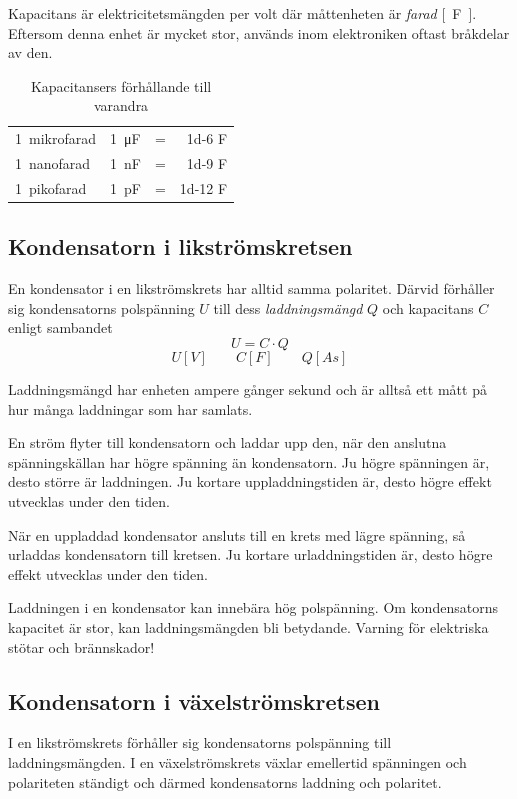 Kapacitans är elektricitetsmängden per volt där måttenheten är \emph{farad} \unit{[F]}.
Eftersom denna enhet är mycket stor, används inom elektroniken oftast bråkdelar
av den.

\begin{table}[h]
\begin{tabular}{llcr}
 \SI{1}{mikrofarad} & \SI{1}{\micro\farad} &=& \num{1d-6} F \\
 \SI{1}{nanofarad}  & \SI{1}{\nano\farad}  &=& \num{1d-9} F \\
 \SI{1}{pikofarad}  & \SI{1}{\pico\farad}  &=& \num{1d-12} F
\end{tabular}
\caption{Kapacitansers förhållande till varandra}
\end{table}

\subsection{Kondensatorn i likströmskretsen}

En kondensator i en likströmskrets har alltid samma polaritet.
Därvid förhåller sig kondensatorns polspänning \(U\) till dess
\emph{laddningsmängd} \(Q\) och kapacitans \(C\) enligt sambandet
\[ U = C \cdot Q \]
\[ 	U \unit{[V]} \qquad C \unit{[F]} \qquad Q \unit{[As]} \]

Laddningsmängd har enheten ampere gånger sekund och är alltså ett mått på hur
många laddningar som har samlats.

En ström flyter till kondensatorn och laddar upp den, när den anslutna
spänningskällan har högre spänning än kondensatorn. Ju högre spänningen är,
desto större är laddningen. Ju kortare uppladdningstiden är, desto högre effekt
utvecklas under den tiden.

När en uppladdad kondensator ansluts till en krets med lägre spänning, så
urladdas kondensatorn till kretsen. Ju kortare urladdningstiden är, desto högre
effekt utvecklas under den tiden.

Laddningen i en kondensator kan innebära hög polspänning. Om kondensatorns
kapacitet är stor, kan laddningsmängden bli betydande. Varning för elektriska
stötar och brännskador!

\subsection{Kondensatorn i växelströmskretsen}

I en likströmskrets förhåller sig kondensatorns polspänning till
laddningsmängden. I en växelströmskrets växlar emellertid spänningen och
polariteten ständigt och därmed kondensatorns laddning och polaritet.

